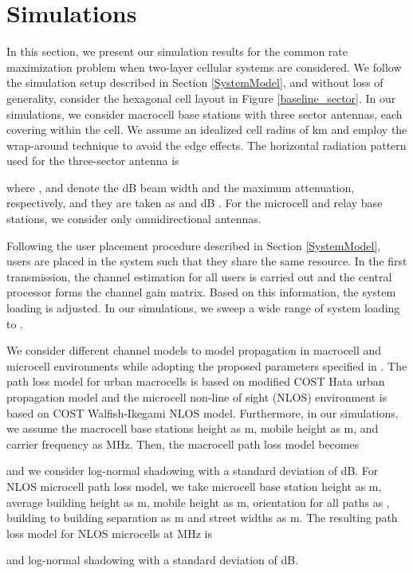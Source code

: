 \documentclass[conference,letterpaper,final,10pt]{IEEEtran}
\begin{document}
\section{Simulations}\label{Simulations}
In this section, we present our simulation results for the common rate maximization problem when two-layer cellular systems are considered.
We follow the simulation setup described in Section \ref{SystemModel}, and without loss of generality, consider the  hexagonal cell layout in Figure \ref{baseline_sector}. In our simulations, we consider macrocell base stations with three sector antennas, each covering  within the cell. We assume an idealized cell radius of  km and employ the wrap-around technique to avoid the edge effects. The horizontal radiation pattern used for the three-sector antenna is

where ,  and
 denote the  dB beam width and the maximum
attenuation, respectively, and they are taken as
 and  dB \cite{UmtsCostHataWI}. For the microcell and relay base stations, we consider only omnidirectional antennas.

Following the user placement procedure described in Section \ref{SystemModel},  users are placed in the system such that they share the same resource. In the first transmission, the channel estimation for all users is carried out and the central processor forms the channel gain matrix. Based on this information, the system loading is adjusted. In our simulations, we sweep a wide range of system loading  to .

We consider different channel models to model propagation in macrocell and microcell environments while adopting the proposed parameters specified in \cite{UmtsCostHataWI}. The path loss model for urban macrocells is based on modified COST  Hata urban propagation model and the microcell non-line of sight (NLOS) environment is based on COST  Walfish-Ikegami NLOS model. Furthermore, in our simulations, we assume the macrocell base stations height as  m, mobile height as  m, and carrier frequency as  MHz. Then, the macrocell path loss model becomes

and we consider log-normal shadowing with a standard deviation of  dB. For NLOS microcell path loss model, we take microcell base station height as  m, average building height as  m, mobile height as  m, orientation for all paths as , building to building separation as  m and street widths as  m. The resulting path loss model for NLOS microcells at  MHz is

and log-normal shadowing with a standard deviation of  dB.
\end{document}
